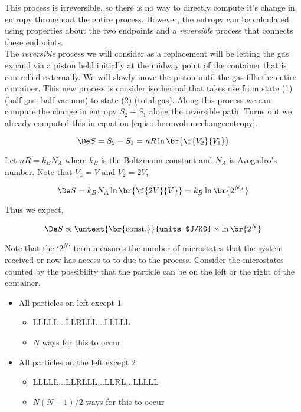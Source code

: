 \documentclass{article}
\begin{document}
This process is irreversible, so there is no way to directly compute it's change in entropy throughout the entire process. However, the entropy can be calculated using properties about the two endpoints and a \textit{reversible} process that connects these endpoints. \\

The \textit{reversible} process we will consider as a replacement will be letting the gas expand via a piston held initially at the midway point of the container that is controlled externally. We will slowly move the piston until the gas fills the entire container. This new process is consider isothermal that takes use from state (1) (half gas, half vacuum) to state (2) (total gas). Along this process we can compute the change in entropy $S_2 - S_1$ along the reversible path. Turns out we already computed this in equation \eqref{eq:isothermvolumechangeentropy}.

\[ \De S = S_2 - S_1 = nR \ln\br{\f{V_2}{V_1}} \]

Let $nR = k_BN_A$ where $k_B$ is the Boltzmann constant and $N_A$ is Avogadro's number. Note that $V_1 = V$ and $V_2 = 2V$,

\[ \De S = k_BN_A \ln\br{\f{2V}{V}} = k_B \ln\br{2^{N_A}} \]

Thus we expect,

\[ \De S \propto \untext{\br{\text{const.}}}{units $J/K$} \times \ln \br{2^N} \]

Note that the `$2^N$' term measures the number of microstates that the system received or now has access to to due to the process. Consider the microstates counted by the possibility that the particle can be on the left or the right of the container.\\

\begin{itemize}
    \item All particles on left except 1
    \begin{itemize}
        \item LLLLL$\ldots$LLRLLL$\ldots$LLLLL
        \item $N$ ways for this to occur
    \end{itemize}
    \item All particles on the left except 2
    \begin{itemize}
        \item LLLLL$\ldots$LLRLLL$\ldots$LLRL$\ldots$LLLLL
        \item $N(N-1)/2$ ways for this to occur
    \end{itemize}
\end{itemize}
\end{document}
